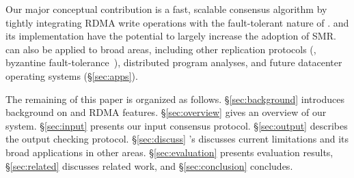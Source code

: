 Our major conceptual contribution is a fast, scalable \paxos consensus 
algorithm by tightly integrating RDMA write operations with the fault-tolerant 
nature of \paxos. \xxx and its implementation have the potential to largely 
increase the adoption of SMR. \xxx can also be applied to broad areas, 
including other replication protocols (\eg, byzantine 
fault-tolerance~\cite{zyzzyva:sosp07,pbft:osdi99}), distributed program 
analyses, and 
future datacenter operating systems (\S\ref{sec:apps}). 


The remaining of this paper is organized as follows. \S\ref{sec:background} 
introduces background on \paxos and RDMA features. \S\ref{sec:overview} gives 
an overview of our \xxx system. \S\ref{sec:input} presents our input consensus 
protocol. \S\ref{sec:output} describes the output checking protocol. 
\S\ref{sec:discuss} \xxx's discusses current limitations and its broad 
applications in other areas. \S\ref{sec:evaluation} presents evaluation 
results, \S\ref{sec:related} discusses related work, and \S\ref{sec:conclusion} 
concludes.   